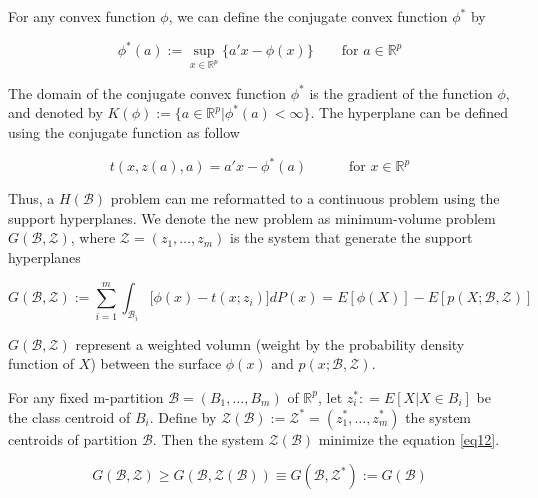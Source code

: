 \documentclass{article}
\begin{document}
\begin{tcolorbox}[coltitle= black!80, colframe=green!35, colback=green!10 ,title=\textbf{Definition: Support Hyperplanes Defined by Conjugate Convex Function}]

For any convex function $\phi$, we can define the conjugate convex function $\phi^*$ by 

\begin{equation}
	\phi^*(a) := \sup_{x\in \mathbb R^p} \Big\{ a'x - \phi(x) \Big\} \quad\quad \text{for } a \in \mathbb R^p
\end{equation}

The domain of the conjugate convex function $\phi^*$ is the gradient of the function $\phi$, and denoted by $K(\phi) := \big\{ a \in \mathbb R^p \big| \phi^*(a) < \infty \big\}$. The hyperplane can be defined using the conjugate function as follow

\begin{equation}
	t(x, z(a), a) = a'x - \phi^*(a) \quad\quad\quad \text{for } x \in \mathbb R^p
\end{equation}
\end{tcolorbox}

Thus, a $H(\mathcal B)$ problem can me reformatted to a continuous problem using the support hyperplanes. We denote the new problem as minimum-volume problem $G(\mathcal B, \mathcal Z)$, where $\mathcal Z = (z_1,\ldots, z_m)$ is the system that generate the support hyperplanes

\begin{equation}\label{eq12}
	G(\mathcal B, \mathcal Z) := \sum_{i=1}^m \int_{\mathcal B_i}\big[\phi(x) - t(x;z_i)  \big] dP(x) = E[\phi(X)] - E[p(X; \mathcal B, \mathcal Z)]
\end{equation}

$G(\mathcal B, \mathcal Z)$ represent a weighted volumn (weight by the probability density function of $X$) between the surface $\phi(x)$ and $p(x; \mathcal B, \mathcal Z)$.




\begin{tcolorbox}[coltitle= black!80, colframe=red!35, colback=red!10 ,title=\textbf{Theorem: Choose $\mathcal Z$ as the Centroid System Minimize the $G(\mathcal B, \mathcal Z)$}]
 For any fixed m-partition $\mathcal B = (B_1, \ldots, B_m)$ of $\mathbb R^p$, let $z_i^* : = E[X|X\in B_i]$ be the class centroid of $B_i$. Define by $\mathcal Z(\mathcal B) := \mathcal Z^* = (z_1^*, \ldots, z_m^*)$ the system centroids of partition $\mathcal B$. Then the system $\mathcal Z(\mathcal B)$ minimize the equation \ref{eq12}.
 
 \begin{equation}
 	G(\mathcal B, \mathcal Z) \ge G(\mathcal B, \mathcal Z(\mathcal B)) \equiv G(\mathcal B, \mathcal Z^*) := G(\mathcal B)
 \end{equation}

\end{tcolorbox}
\end{document}
